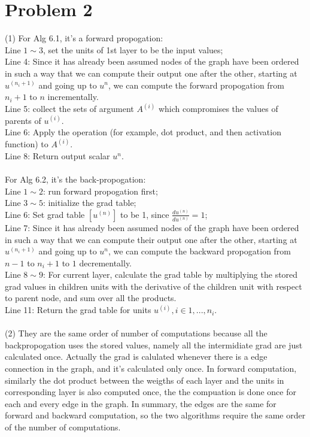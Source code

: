\documentclass[12pt]{article}
\begin{document}
\section{Problem 2}
(1) For Alg 6.1, it's a forward propogation:\\
Line $1\sim 3$, set the units of 1st layer to be the input values;\\
Line 4: Since it has already been assumed nodes of the graph have been
ordered in such a way that we can compute their output one after the
other, starting at $u^{(n_i+1)}$ and going up to $u^n$, we can compute
the forward propogation from $n_i+1$ to $n$ incrementally.\\
Line 5: collect the sets of argument $A^{(i)}$ which compromises the
values of parents of $u^{(i)}$.\\
Line 6: Apply the operation (for example, dot product, and then
activation function) to $A^{(i)}$.\\
Line 8: Return output scalar $u^n$.\\\\
For Alg 6.2, it's the back-propogation:\\
Line $1\sim2$: run forward propogation first;\\
Line $3\sim5$: initialize the grad table;\\
Line 6: Set grad table $[u^{(n)}]$ to be 1, since $\frac{du^{(n)}}{du^{(n)}}=1$;\\
Line 7: Since it has already been assumed nodes of the graph have been
ordered in such a way that we can compute their output one after the
other, starting at $u^{(n_i+1)}$ and going up to $u^n$, we can compute
the backward propogation from $n-1$ to $n_i+1$ to $1$ decrementally.\\
Line $8\sim9$: For current layer, calculate the grad table by
multiplying the stored grad values in children units with the
derivative of the children unit with respect to parent node, and sum
over all the products.\\
Line 11: Return the grad table for units $u^{(i)}, i\in{1, ...,
n_i}$.\\\\
(2) They are the same order of number of computations because all the
backpropogation uses the stored values, namely all the intermidiate
grad are just calculated once. Actually the grad is calulated whenever
there is a edge connection in the graph, and it's calculated only
once. In forward computation, similarly the dot product between the
weigths of each layer and the units in corresponding layer is also
computed once, the the compuation is done once for each and every edge
in the graph. In summary, the edges are the same for forward and
backward computation, so the two algorithms require the same order of
the number of computations.
\end{document}
